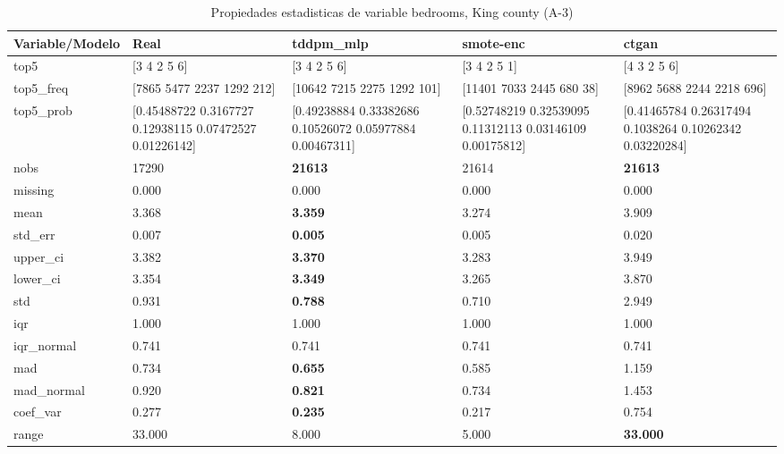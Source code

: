 \begin{table}[H]
\centering
\fontsize{8}{14}\selectfont
\caption{Propiedades  estadisticas de variable bedrooms, King county (A-3)}
\label{table-stats-king county-a-3-bedrooms}
\begin{tabular}{|l|m{10em}|m{10em}|m{10em}|m{10em}|}
\hline
 \rowcolor[gray]{0.8}
Variable/Modelo & Real & tddpm\_mlp & smote-enc & ctgan \\
\hline top5 & [3 4 2 5 6] & [3 4 2 5 6] & [3 4 2 5 1] & [4 3 2 5 6] \\
\hline top5\_freq & [7865 5477 2237 1292  212] & [10642  7215  2275  1292   101] & [11401  7033  2445   680    38] & [8962 5688 2244 2218  696] \\
\hline top5\_prob & [0.45488722 0.3167727  0.12938115 0.07472527 0.01226142] & [0.49238884 0.33382686 0.10526072 0.05977884 0.00467311] & [0.52748219 0.32539095 0.11312113 0.03146109 0.00175812] & [0.41465784 0.26317494 0.1038264  0.10262342 0.03220284] \\
\hline nobs & 17290 & \bfseries 21613 & \cellcolor[rgb]{0.9, 0.54, 0.52} 21614 & \bfseries 21613 \\
\hline missing & 0.000 & 0.000 & 0.000 & 0.000 \\
\hline mean & 3.368 & \bfseries 3.359 & 3.274 & \cellcolor[rgb]{0.9, 0.54, 0.52} 3.909 \\
\hline std\_err & 0.007 & \bfseries 0.005 & 0.005 & \cellcolor[rgb]{0.9, 0.54, 0.52} 0.020 \\
\hline upper\_ci & 3.382 & \bfseries 3.370 & 3.283 & \cellcolor[rgb]{0.9, 0.54, 0.52} 3.949 \\
\hline lower\_ci & 3.354 & \bfseries 3.349 & 3.265 & \cellcolor[rgb]{0.9, 0.54, 0.52} 3.870 \\
\hline std & 0.931 & \bfseries 0.788 & 0.710 & \cellcolor[rgb]{0.9, 0.54, 0.52} 2.949 \\
\hline iqr & 1.000 & 1.000 & 1.000 & 1.000 \\
\hline iqr\_normal & 0.741 & 0.741 & 0.741 & 0.741 \\
\hline mad & 0.734 & \bfseries 0.655 & 0.585 & \cellcolor[rgb]{0.9, 0.54, 0.52} 1.159 \\
\hline mad\_normal & 0.920 & \bfseries 0.821 & 0.734 & \cellcolor[rgb]{0.9, 0.54, 0.52} 1.453 \\
\hline coef\_var & 0.277 & \bfseries 0.235 & 0.217 & \cellcolor[rgb]{0.9, 0.54, 0.52} 0.754 \\
\hline range & 33.000 & 8.000 & \cellcolor[rgb]{0.9, 0.54, 0.52} 5.000 & \bfseries 33.000 \\

\end{tabular}
\end{table}
